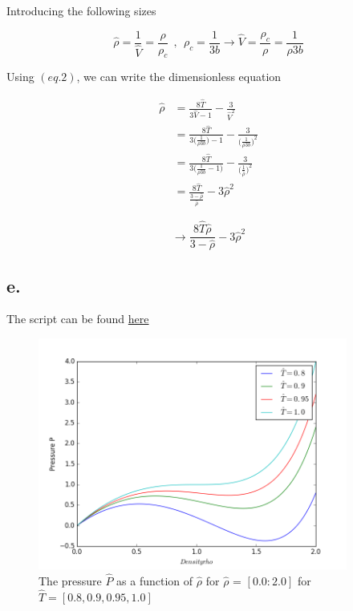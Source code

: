 \documentclass{article}
\begin{document}
Introducing the following sizes

\begin{equation}
\hat{\rho} = \frac{1}{\hat{V}} = \frac{\rho}{\rho_c} \ \ , \ \ \rho_c = \frac{1}{3b} \rightarrow \hat{V} = \frac{\rho_c}{\rho} = \frac{1}{\rho 3b}
\end{equation}

Using $(eq. 2)$, we can write the dimensionless equation

\begin{align*}
\hat{\rho} & = \frac{8\hat{T}}{3\hat{V} - 1} - \frac{3}{\hat{V}^2}\\
           & = \frac{8\hat{T}}{3\big(\frac{1}{\rho 3b}\big)-1} - \frac{3}{\big(\frac{1}{\rho 3b}\big)^2}\\
           & = \frac{8\hat{T}}{3\big(\frac{1}{\rho 3b} - 1\big)} - \frac{3}{\big(\frac{1}{\hat{\rho}}\big)^2}\\
           & = \frac{8\hat{T}}{\frac{3 - \hat{\rho}}{\hat{\rho}}} - 3\hat{\rho}^2
\end{align*}

\begin{equation}
\rightarrow \frac{8\hat{T}\hat{\rho}}{3 - \hat{\rho}} - 3\hat{\rho}^2
\label{eq:dimlessPress_vol}
\end{equation}

\subsection*{e.}

The script can be found \hyperlink{code_problem_e}{here}

\begin{figure}[H]
    \centering
    \includegraphics[width=4in]{project_1/problem_e}
    \caption[Plot from problem e.]
    {The pressure $\hat{P}$ as a function of $\hat{\rho}$ for $\hat{\rho}$ = $[0.0:2.0]$ for $\hat{T} = [0.8, 0.9, 0.95,1.0]$}
\end{figure}
\end{document}
